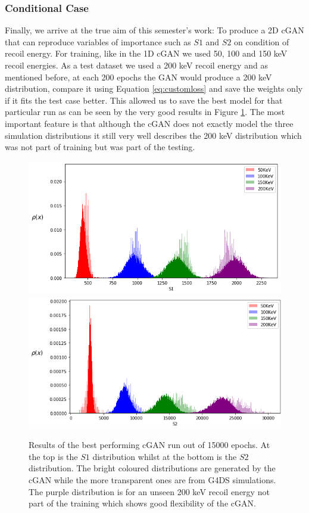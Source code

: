\documentclass[11pt]{article} %
\begin{document}
\subsubsection{Conditional Case}

Finally, we arrive at the true aim of this semester's work: To produce a 2D cGAN that can reproduce variables of importance such as $S1$ and $S2$ on condition of recoil energy. For training, like in the 1D cGAN we used 50, 100 and 150 keV recoil energies. As a test dataset we used a 200 keV recoil energy and as mentioned before, at each 200 epochs the GAN would produce a 200 keV distribution, compare it using Equation \ref{eq:customloss} and save the weights only if it fits the test case better. This allowed us to save the best model for that particular run as can be seen by the very good results in Figure \ref{fig:2DcGAN}. The most important feature is that although the cGAN does not exactly model the three simulation distributions it still very well describes the 200 keV distribution which was not part of training but was part of the testing.

\begin{figure}[H]
\centering
\includegraphics[scale=0.6]{images/2d_conditional_s1.png}
\linebreak
\includegraphics[scale=0.6]{images/2d_conditional_s2.png}
\caption{Results of the best performing cGAN run out of 15000 epochs. At the top is the $S1$ distribution whilst at the bottom is the $S2$ distribution. The bright coloured distributions are generated by the cGAN while the more transparent ones are from G4DS simulations. The purple distribution is for an unseen 200 keV recoil energy not part of the training which shows good flexibility of the cGAN.}
\label{fig:2DcGAN}
\end{figure}
\end{document}
